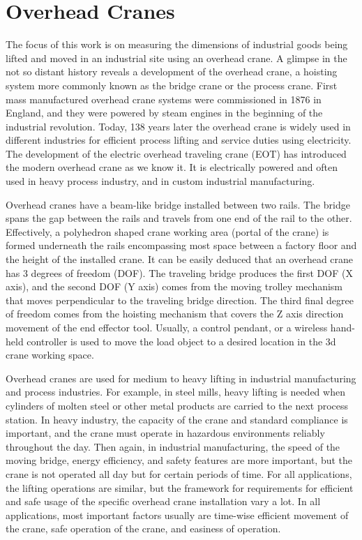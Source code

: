 \documentclass[12pt,a4paper,oneside,pdftex]{report}
\begin{document}
\section{Overhead Cranes}
\label{section:overhead_cranes}
The focus of this work is on measuring the dimensions of industrial goods being lifted and moved in an industrial site using an overhead crane. A glimpse in the not so distant history reveals a development of the overhead crane, a hoisting system more commonly known as the bridge crane or the process crane. First mass manufactured overhead crane systems were commissioned in 1876 in England, and they were powered by steam engines in the beginning of the industrial revolution. Today, 138 years later the overhead crane is widely used in different industries for efficient process lifting and service duties using electricity. The development of the electric overhead traveling crane (EOT) has introduced the modern overhead crane as we know it. It is electrically powered and often used in heavy process industry, and in custom industrial manufacturing.\par
    Overhead cranes have a beam-like bridge installed between two rails. The bridge spans the gap between the rails and travels from one end of the rail to the other. Effectively, a polyhedron shaped crane working area (portal of the crane) is formed underneath the rails encompassing most space between a factory floor and the height of the installed crane. It can be easily deduced that an overhead crane has 3 degrees of freedom (DOF). The traveling bridge produces the first DOF (X axis), and the second DOF (Y axis) comes from the moving trolley mechanism that moves perpendicular to the traveling bridge direction. The third final degree of freedom comes from the hoisting mechanism that covers the Z axis direction movement of the end effector tool. Usually, a control pendant, or a wireless hand-held controller is used to move the load object to a desired location in the 3d crane working space. \par
    Overhead cranes are used for medium to heavy lifting in industrial manufacturing and process industries. For example, in steel mills, heavy lifting is needed when cylinders of molten steel or other metal products are carried to the next process station. In heavy industry, the capacity of the crane and standard compliance is important, and the crane must operate in hazardous environments reliably throughout the day. Then again, in industrial manufacturing, the speed of the moving bridge, energy efficiency, and safety features are more important, but the crane is not operated all day but for certain periods of time. For all applications, the lifting operations are similar, but the framework for requirements for efficient and safe usage of the specific overhead crane installation vary a lot. In all applications, most important factors usually are time-wise efficient movement of the crane, safe operation of the crane, and easiness of operation.\par
\end{document}

